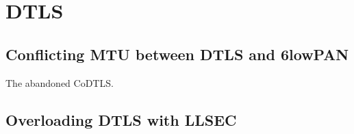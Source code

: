 \chapter{DTLS}



\section{Conflicting MTU between DTLS and 6lowPAN}
The abandoned CoDTLS.
\section{Overloading DTLS with LLSEC}